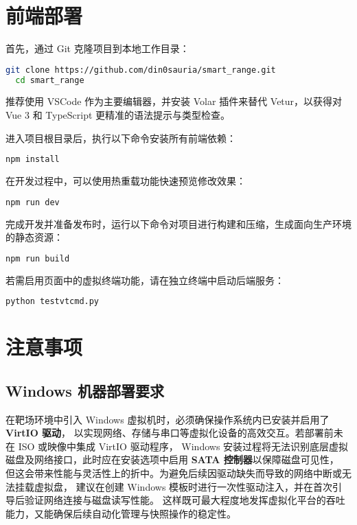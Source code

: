 \documentclass[lang=cn,10pt]{elegantbook}
\begin{document}
\section{前端部署}

首先，通过 Git 克隆项目到本地工作目录：
\begin{lstlisting}[language=bash]
  git clone https://github.com/din0sauria/smart_range.git
  cd smart_range
\end{lstlisting}

推荐使用 VSCode 作为主要编辑器，并安装 Volar 插件来替代 Vetur，以获得对 Vue 3 和 TypeScript 更精准的语法提示与类型检查。

进入项目根目录后，执行以下命令安装所有前端依赖：
\begin{lstlisting}[language=bash]
  npm install
\end{lstlisting}

在开发过程中，可以使用热重载功能快速预览修改效果：
\begin{lstlisting}[language=bash]
  npm run dev
\end{lstlisting}

完成开发并准备发布时，运行以下命令对项目进行构建和压缩，生成面向生产环境的静态资源：
\begin{lstlisting}[language=bash]
  npm run build
\end{lstlisting}

若需启用页面中的虚拟终端功能，请在独立终端中启动后端服务：
\begin{lstlisting}[language=bash]
  python testvtcmd.py
\end{lstlisting}





\section{注意事项}

\subsection{Windows 机器部署要求}
在靶场环境中引入 Windows 虚拟机时，必须确保操作系统内已安装并启用了 \textbf{VirtIO 驱动}，
以实现网络、存储与串口等虚拟化设备的高效交互。若部署前未在 ISO 或映像中集成 VirtIO 驱动程序，
Windows 安装过程将无法识别底层虚拟磁盘及网络接口，此时应在安装选项中启用 \textbf{SATA 控制器}以保障磁盘可见性，
但这会带来性能与灵活性上的折中。为避免后续因驱动缺失而导致的网络中断或无法挂载虚拟盘，
建议在创建 Windows 模板时进行一次性驱动注入，并在首次引导后验证网络连接与磁盘读写性能。
这样既可最大程度地发挥虚拟化平台的吞吐能力，又能确保后续自动化管理与快照操作的稳定性。
\end{document}
